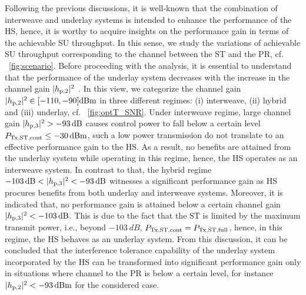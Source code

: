 Following the previous discussions, it is well-known that the combination of interweave and underlay systems is intended to enhance the performance of the HS, hence, it is worthy to acquire insights on the performance gain in terms of the achievable SU throughput. In this sense, we study the variations of achievable SU throughput corresponding to the channel between the ST and the PR, cf. \figurename~\ref{fig:scenario}. Before proceeding with the analysis, it is essential to understand that the performance of the underlay system decreases with the increase in the channel gain $|h_{\text{p,2}}|^2$ \cite{Kaushik16_CL}. In this view, we categorize the channel gain $|h_{\text{p,2}}|^2 \in [-110, -90] \SI{}{dBm}$ in three different regimes: (i) interweave, (ii) hybrid and (iii) underlay, cf. \figurename~\ref{fig:optT_SNR}. Under interweave regime, large channel gain $|h_{\text{p,3}}|^2 > -\SI{93}{dB}$ causes control power to fall below a certain level $P_{\text{Tx,ST,cont}} \le \SI{-30}{dBm}$, such a low power transmission do not translate to an effective performance gain to the HS. As a result, no benefits are attained from the underlay system while operating in this regime, hence, the HS operates as an interweave system. In contrast to that, the hybrid regime $-\SI{103}{dB} < |h_{\text{p,3}}|^2 < -\SI{93}{dB}$ witnesses a significant performance gain as HS procures benefits from both underlay and interweave systems. Moreover, it is indicated that, no performance gain is attained below a certain channel gain $|h_{\text{p,3}}|^2 < \SI{-103}{dB}$. This is due to the fact that the ST is limited by the maximum transmit power, i.e., beyond $\SI{-103}{dB}$, $P_{\text{Tx,ST,cont}} = P_{\text{Tx,ST,full}}$, hence, in this regime, the HS behaves as an underlay system. From this discussion, it can be concluded that the interference tolerance capability of the underlay system incorporated by the HS can be transformed into significant performance gain only in situations where channel to the PR is below a certain level, for instance $|h_{\text{p,2}}|^2 < -\SI{93}{dBm}$ for the considered case.   

